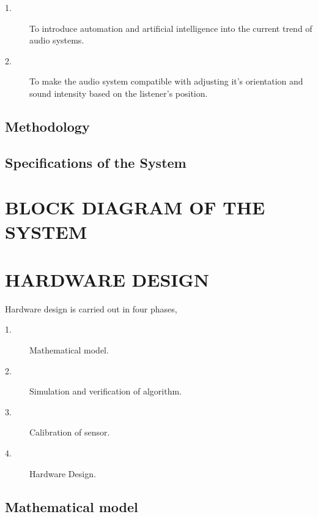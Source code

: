 \documentclass[twocolumn]{report}
\begin{document}
\begin{description}
    
    \item[1.]To introduce automation and artificial intelligence into the current 
    trend of audio systems.
    \item[2.]To make the audio system compatible with adjusting it’s orientation 
    and sound intensity based on the listener’s position.

\end{description}

\section{Methodology}



\section{Specifications of the System}



\chapter{BLOCK DIAGRAM OF THE SYSTEM}



\chapter{HARDWARE DESIGN}

Hardware design is carried out in four phases,

\begin{description}
    \item[1.]Mathematical model.
    \item[2.]Simulation and verification of algorithm.
    \item[3.]Calibration of sensor.
    \item[4.]Hardware Design. 
\end{description}

\section{Mathematical model}
\end{document}
